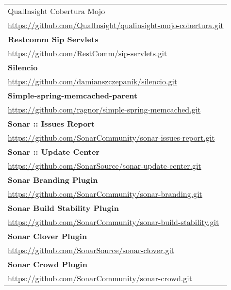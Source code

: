 \begin{table}[]
\begin{tabular}{|p{130mm}|}
QualInsight Cobertura Mojo                         \\ \url{https://github.com/QualInsight/qualinsight-mojo-cobertura.git}                \\ \hline \bf
Restcomm Sip Servlets                              \\ \url{https://github.com/RestComm/sip-servlets.git}                                 \\ \hline \bf
Silencio                                           \\ \url{https://github.com/damianszczepanik/silencio.git}                             \\ \hline \bf
Simple-spring-memcached-parent                     \\ \url{https://github.com/ragnor/simple-spring-memcached.git}                        \\ \hline \bf
Sonar :: Issues Report                  \\ \url{https://github.com/SonarCommunity/sonar-issues-report.git}                    \\ \hline \bf
Sonar :: Update Center                             \\ \url{https://github.com/SonarSource/sonar-update-center.git}                       \\ \hline \bf
Sonar Branding Plugin                              \\ \url{https://github.com/SonarCommunity/sonar-branding.git}                         \\ \hline \bf 
Sonar Build Stability Plugin                       \\ \url{https://github.com/SonarCommunity/sonar-build-stability.git}                  \\ \hline \bf
Sonar Clover Plugin                                \\ \url{https://github.com/SonarSource/sonar-clover.git}                              \\ \hline \bf
Sonar Crowd Plugin                                 \\ \url{https://github.com/SonarCommunity/sonar-crowd.git}                            \\ \hline

\end{tabular}
\end{table}

